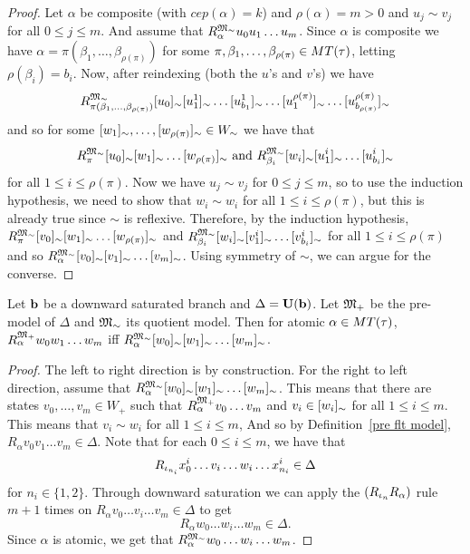 \begin{proof}
    \par Let $\alpha$ be composite (with $cep(\alpha)=k$) and $\rho(\alpha)=m>0$ and $u_j\sim v_j$ for all $0\leq j \leq m$. And assume that $R^{\mathfrak{M}_\sim}_\alpha u_0u_1\ldots u_m$. Since $\alpha$ is composite we have $\alpha = \pi(\beta_1,\ldots,\beta_{\rho(\pi)})$ for some $\pi,\beta_1,\ldots,\beta_{\rho(\pi)}\in MT(\tau)$, letting $\rho(\beta_i)=b_i$. Now, after reindexing (both the $u$'s and $v$'s) we have $$R^{\mathfrak{M}_\sim}_{\pi(\beta_1,\ldots,\beta_{\rho(\pi)})} [u_0]_\sim[u^1_1]_\sim\ldots [u^1_{b_1}]_\sim\ldots [u^{\rho(\pi)}_{1}]_\sim \ldots [u^{\rho(\pi)}_{b_{\rho(\pi)}}]_\sim$$ and so for some $[w_1]_\sim,\ldots,[w_{\rho(\pi)}]_\sim\in W_\sim$ we have that $$R^{\mathfrak{M}_\sim}_\pi [u_0]_\sim[w_1]_\sim\ldots [w_{\rho(\pi)}]_\sim \text{ and } R^{\mathfrak{M}_\sim}_{\beta_i} [w_i]_\sim [u^i_1]_\sim\ldots [u^i_{b_i}]_\sim$$ for all $1\leq i\leq \rho(\pi)$. Now we have $u_j\sim v_j$ for $0\leq j \leq m$, so to use the induction hypothesis, we need to show that $w_i\sim w_i$ for all $1\leq i\leq \rho(\pi)$, but this is already true since $\sim$ is reflexive. Therefore, by the induction hypothesis, $R^{\mathfrak{M}_\sim}_\pi [v_0]_\sim[w_1]_\sim\ldots [w_{\rho(\pi)}]_\sim$ and $R^{\mathfrak{M}_\sim}_{\beta_i} [w_i]_\sim[v^i_1]_\sim\ldots [v^i_{b_i}]_\sim$ for all $1\leq i\leq \rho(\pi)$ and so $R^{\mathfrak{M}_\sim}_\alpha [v_0]_\sim[v_1]_\sim\ldots [v_m]_\sim$. Using symmetry of $\sim$, we can argue for the converse.
\end{proof}


\begin{lemma}\label{relations on original and quotient correspond lemma}
     Let $\textbf{b}$ be a downward saturated branch and $\Delta=\textbf{U}(\textbf{b})$. Let ${\mathfrak{M}_+}$ be the pre-model of $\Delta$ and ${\mathfrak{M}_\sim}$ its quotient model. Then for atomic $\alpha\in MT(\tau)$, $R^{{\mathfrak{M}_+}}_\alpha w_0 w_1\ldots w_m$ iff $R^{{\mathfrak{M}_\sim}}_\alpha [w_0]_\sim[w_1]_\sim\ldots[w_m]_\sim$. 
\end{lemma}

\begin{proof}
    The left to right direction is by construction. For the right to left direction, assume that $R^{{\mathfrak{M}_\sim}}_\alpha [w_0]_\sim[w_1]_\sim\ldots[w_m]_\sim$.
    This means that there are states $v_0,\ldots,v_m\in W_+$ such that $R^{{\mathfrak{M}_+}}_\alpha v_0\ldots v_m$ and $v_i\in [w_i]_\sim$ for all $1\leq i\leq m$. This means that $v_i \sim w_i$ for all $1\leq i\leq m$, And so by Definition~\ref{pre flt model}, $R_\alpha v_0v_1\ldots v_m\in \Delta$. Note that for each $0\leq i \leq m$, we have that $$R_{\iota_{n_i}}x_0^i \ldots v_i \ldots w_i \ldots x_{n_i}^i\in \Delta$$  for $n_i\in\{1,2\}$. Through downward saturation we can apply the $(R_{\iota_n} R_\alpha)$ rule $m+1$ times on $R_\alpha v_0\ldots v_i \ldots v_m\in \Delta$ to get $$R_\alpha w_0\ldots w_i \ldots w_m\in\Delta.$$ Since $\alpha$ is atomic, we get that $R^{\mathfrak{M}_\sim}_\alpha w_0\ldots w_i \ldots w_m$.
\end{proof}

